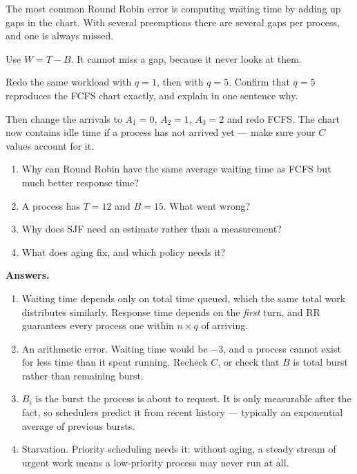 \begin{pitfall}
The most common Round Robin error is computing waiting time by adding up gaps in the chart. With several preemptions there are several gaps per process, and one is always missed.

Use $W = T - B$. It cannot miss a gap, because it never looks at them.
\end{pitfall}

\begin{tryit}
Redo the same workload with $q = 1$, then with $q = 5$. Confirm that $q = 5$ reproduces the FCFS chart exactly, and explain in one sentence why.

Then change the arrivals to $A_1 = 0$, $A_2 = 1$, $A_3 = 2$ and redo FCFS. The chart now contains idle time if a process has not arrived yet --- make sure your $C$ values account for it.
\end{tryit}

\begin{quickcheck}
\begin{enumerate}
  \item Why can Round Robin have the same average waiting time as FCFS but much better response time?
  \item A process has $T = 12$ and $B = 15$. What went wrong?
  \item Why does SJF need an estimate rather than a measurement?
  \item What does aging fix, and which policy needs it?
\end{enumerate}

\medskip\noindent\textbf{Answers.}
\begin{enumerate}
  \item Waiting time depends only on total time queued, which the same total work distributes similarly. Response time depends on the \emph{first} turn, and RR guarantees every process one within $n \times q$ of arriving.
  \item An arithmetic error. Waiting time would be $-3$, and a process cannot exist for less time than it spent running. Recheck $C$, or check that $B$ is total burst rather than remaining burst.
  \item $B_i$ is the burst the process is about to request. It is only measurable after the fact, so schedulers predict it from recent history --- typically an exponential average of previous bursts.
  \item Starvation. Priority scheduling needs it: without aging, a steady stream of urgent work means a low-priority process may never run at all.
\end{enumerate}
\end{quickcheck}


